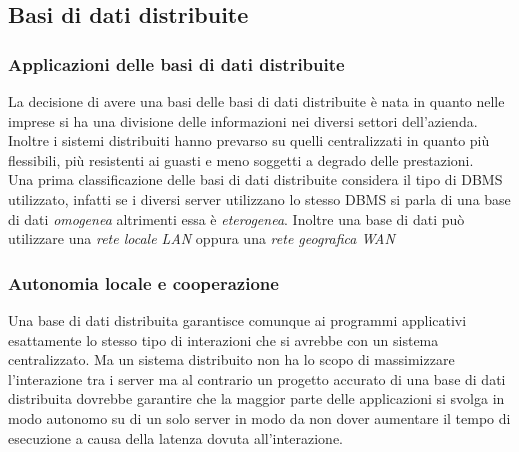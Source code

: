 \subsection{Basi di dati distribuite}
\subsubsection{Applicazioni delle basi di dati distribuite}
La decisione di avere una basi delle basi di dati distribuite è nata in quanto nelle imprese si ha una divisione delle informazioni nei diversi settori dell'azienda. Inoltre i sistemi distribuiti hanno prevarso su quelli centralizzati in quanto più flessibili, più resistenti ai guasti e meno soggetti a degrado delle prestazioni.\\
Una prima classificazione delle basi di dati distribuite considera il tipo di DBMS utilizzato, infatti se i diversi server utilizzano lo stesso DBMS si parla di una base di dati \emph{omogenea} altrimenti essa è \emph{eterogenea}.
Inoltre una base di dati può utilizzare una \emph{rete locale LAN} oppura una \emph{rete geografica WAN}
\subsubsection{Autonomia locale e cooperazione}
Una base di dati distribuita garantisce comunque ai programmi applicativi esattamente lo stesso tipo di interazioni che si avrebbe con un sistema centralizzato. Ma un sistema distribuito non ha lo scopo di massimizzare l'interazione tra i server ma al contrario un progetto accurato di una base di dati distribuita dovrebbe garantire che la maggior parte delle applicazioni si svolga in modo autonomo su di un solo server in modo da non dover aumentare il tempo di esecuzione a causa della latenza dovuta all'interazione.
